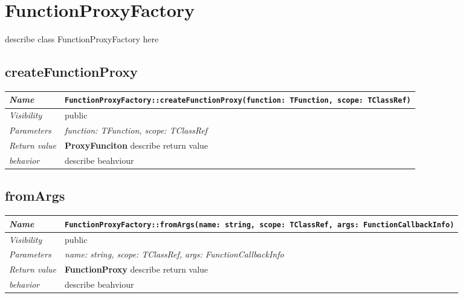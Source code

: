 \chapter{FunctionProxyFactory}
describe class FunctionProxyFactory here
\section{createFunctionProxy}
\begin{longtable}{p{3cm} @{\hskip 1cm} p{12cm}}
 \hline
\textit{Name} & \texttt{FunctionProxyFactory::createFunctionProxy(function: TFunction, scope: TClassRef)}\\
\hline
 \textit{Visibility} & public\\
\hline
\textit{Parameters} & \textit{function: TFunction, scope: TClassRef}\\
\hline
\textit{Return value} & \textbf{ ProxyFunciton} describe return value\\
  \hline
 \textit{behavior} & describe beahviour \\
\hline
\end{longtable} \pagebreak
 \section{fromArgs}
\begin{longtable}{p{3cm} @{\hskip 1cm} p{12cm}}
 \hline
\textit{Name} & \texttt{FunctionProxyFactory::fromArgs(name: string, scope: TClassRef, args: FunctionCallbackInfo)}\\
\hline
 \textit{Visibility} & public\\
\hline
\textit{Parameters} & \textit{name: string, scope: TClassRef, args: FunctionCallbackInfo}\\
\hline
\textit{Return value} & \textbf{ FunctionProxy} describe return value\\
  \hline
 \textit{behavior} & describe beahviour \\
\hline
\end{longtable} \pagebreak
 